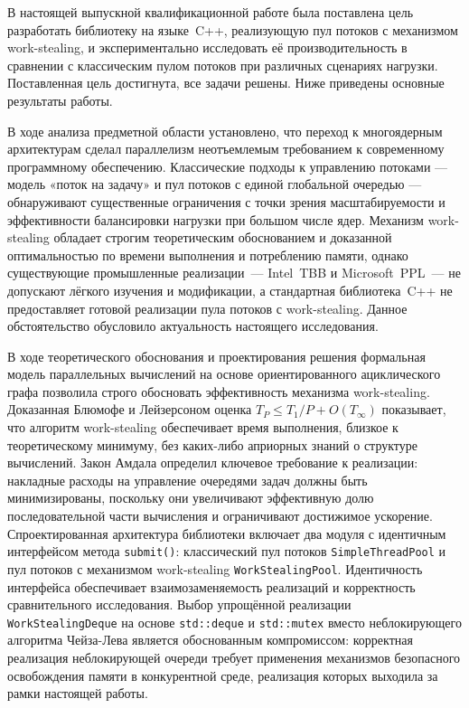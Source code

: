 \conclusion

В настоящей выпускной квалификационной работе была поставлена цель
разработать библиотеку на языке~C++, реализующую пул потоков с механизмом
work-stealing, и экспериментально исследовать её производительность в
сравнении с классическим пулом потоков при различных сценариях нагрузки.
Поставленная цель достигнута, все задачи решены. Ниже приведены основные
результаты работы.

В ходе анализа предметной области установлено, что переход к многоядерным
архитектурам сделал параллелизм неотъемлемым требованием к современному
программному обеспечению. Классические подходы к управлению потоками ---
модель «поток на задачу» и пул потоков с единой глобальной очередью ---
обнаруживают существенные ограничения с точки зрения масштабируемости
и эффективности балансировки нагрузки при большом числе ядер. Механизм
work-stealing обладает строгим теоретическим обоснованием и доказанной
оптимальностью по времени выполнения и потреблению памяти, однако
существующие промышленные реализации~--- Intel~TBB и Microsoft~PPL~---
не допускают лёгкого изучения и модификации, а стандартная библиотека~C++
не предоставляет готовой реализации пула потоков с work-stealing. Данное
обстоятельство обусловило актуальность настоящего исследования.

В ходе теоретического обоснования и проектирования решения формальная
модель параллельных вычислений на основе ориентированного ациклического
графа позволила строго обосновать эффективность механизма work-stealing.
Доказанная Блюмофе и Лейзерсоном оценка $T_P \leq T_1 / P + O(T_\infty)$
показывает, что алгоритм work-stealing обеспечивает время выполнения,
близкое к теоретическому минимуму, без каких-либо априорных знаний
о структуре вычислений. Закон Амдала определил ключевое требование
к реализации: накладные расходы на управление очередями задач должны
быть минимизированы, поскольку они увеличивают эффективную долю
последовательной части вычисления и ограничивают достижимое ускорение.
Спроектированная архитектура библиотеки включает два модуля с идентичным
интерфейсом метода \texttt{submit()}: классический пул потоков
\texttt{SimpleThreadPool} и пул потоков с механизмом work-stealing
\texttt{WorkStealingPool}. Идентичность интерфейса обеспечивает
взаимозаменяемость реализаций и корректность сравнительного исследования.
Выбор упрощённой реализации \texttt{WorkStealingDeque} на основе
\texttt{std::deque} и \texttt{std::mutex} вместо неблокирующего алгоритма
Чейза-Лева является обоснованным компромиссом: корректная реализация
неблокирующей очереди требует применения механизмов безопасного
освобождения памяти в конкурентной среде, реализация которых выходила
за рамки настоящей работы.

